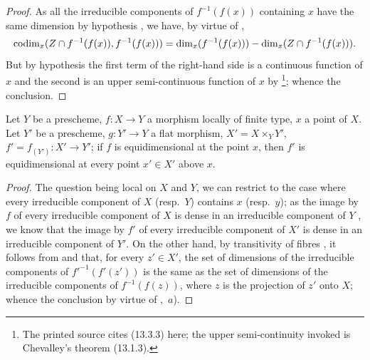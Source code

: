\begin{proof}
As all the irreducible components of $f^{-1}(f(x))$ containing $x$ have the same dimension by hypothesis , we have, by virtue of ,
\[
  \operatorname{codim}_x(Z\cap f^{-1}(f(x)),f^{-1}(f(x)))=\dim_x(f^{-1}(f(x)))-\dim_x(Z\cap f^{-1}(f(x))).
\]
But by hypothesis the first term of the right-hand side is a continuous function of $x$  and the second is an upper semi-continuous function of $x$ by \footnote{The printed source cites (13.3.3) here; the upper semi-continuity invoked is Chevalley's theorem (13.1.3).}; whence the conclusion.
\end{proof}

\begin{proposition}[13.3.8]
\label{IV.13.3.8}
Let $Y$ be a prescheme, $f:X\to Y$ a morphism locally of finite type, $x$ a point of $X$.
Let $Y'$ be a prescheme, $g:Y'\to Y$ a \textup{flat} morphism, $X'=X\times_Y Y'$, $f'=f_{(Y')}:X'\to Y'$; if $f$ is equidimensional at the point $x$, then $f'$ is equidimensional at every point $x'\in X'$ above $x$.
\end{proposition}

\begin{proof}
The question being local on $X$ and $Y$, we can restrict to the case where every irreducible component of $X$ (resp.\ $Y$) contains $x$ (resp.\ $y$); as the image by $f$ of every irreducible component of $X$ is dense in an irreducible component of $Y$ , we know  that the image by $f'$ of every irreducible component of $X'$ is dense in an irreducible component of $Y'$.
On the other hand, by transitivity of fibres , it follows from  and  that, for every $z'\in X'$, the set of dimensions of the irreducible components of ${f'}^{-1}(f'(z'))$ is the same as the set of dimensions of the irreducible components of $f^{-1}(f(z))$, where $z$ is the projection of $z'$ onto $X$; whence the conclusion by virtue of ,~$a$).
\end{proof}

